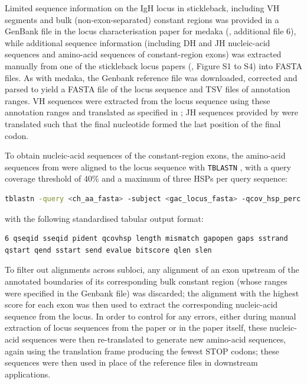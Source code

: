 Limited sequence information on the IgH locus in stickleback, including VH segments and bulk (non-exon-separated) constant regions was provided in a GenBank file in the locus characterisation paper for medaka (\citep{magadan2011medaka}, additional file 6), while additional sequence information (including DH and JH nucleic-acid sequences and amino-acid sequences of constant-region exons) was extracted manually from one of the stickleback locus papers (\citep{bao2010stickleback},  Figure S1 to S4) into FASTA files. As with medaka, the Genbank reference file was downloaded, corrected and parsed to yield a FASTA file of the locus sequence and TSV files of annotation ranges. VH sequences were extracted from the locus sequence using these annotation ranges and translated as specified in ; JH sequences provided by \citep{bao2010stickleback} were translated such that the final nucleotide formed the last position of the final codon.

To obtain nucleic-acid sequences of the constant-region exons, the amino-acid sequences from \citep{bao2010stickleback} were aligned to the locus sequence with \lstinline{TBLASTN} \citep{gertz2006tblastn}, with a query coverage threshold of 40\% and a maximum of three HSPs per query sequence:

\begin{lstlisting}[language=bash]
tblastn -query <ch_aa_fasta> -subject <gac_locus_fasta> -qcov_hsp_perc 40 -max_hsps 3 -outfmt '<output_format>' > <output_path>
\end{lstlisting}

\noindent with the following standardised tabular output format: 

\begin{lstlisting}
6 qseqid sseqid pident qcovhsp length mismatch gapopen gaps sstrand qstart qend sstart send evalue bitscore qlen slen
\end{lstlisting}

To filter out alignments across subloci, any alignment of an exon upstream of the annotated boundaries of its corresponding bulk constant region (whose ranges were specified in the Genbank file) was discarded; the alignment with the highest score for each exon was then used to extract the corresponding nucleic-acid sequence from the locus. In order to control for any errors, either during manual extraction of locus sequences from the paper or in the paper itself, these nucleic-acid sequences were then re-translated to generate new amino-acid sequences, again using the translation frame producing the fewest STOP codons; these sequences were then used in place of the reference files in downstream applications.


